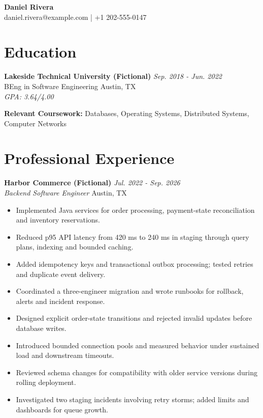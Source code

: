 \documentclass[11pt,a4paper]{article}
\begin{document}
\begin{center}
{\Huge\bfseries Daniel Rivera}\\[6pt]
{\small daniel.rivera@example.com \quad | \quad +1 202-555-0147}
\end{center}
\section{Education}
\textbf{Lakeside Technical University (Fictional)} \hfill \textit{Sep. 2018 - Jun. 2022}\\
BEng in Software Engineering \hfill Austin, TX\\
\textit{GPA: 3.64/4.00}

\textbf{Relevant Coursework:} Databases, Operating Systems, Distributed Systems, Computer Networks
\vspace{4pt}

\section{Professional Experience}
\textbf{Harbor Commerce (Fictional)} \hfill \textit{Jul. 2022 - Sep. 2026}\\
\textit{Backend Software Engineer} \hfill Austin, TX
\begin{itemize}[leftmargin=*,noitemsep,topsep=2pt]
\item Implemented Java services for order processing, payment-state reconciliation and inventory reservations.
\item Reduced p95 API latency from 420 ms to 240 ms in staging through query plans, indexing and bounded caching.
\item Added idempotency keys and transactional outbox processing; tested retries and duplicate event delivery.
\item Coordinated a three-engineer migration and wrote runbooks for rollback, alerts and incident response.
\item Designed explicit order-state transitions and rejected invalid updates before database writes.
\item Introduced bounded connection pools and measured behavior under sustained load and downstream timeouts.
\item Reviewed schema changes for compatibility with older service versions during rolling deployment.
\item Investigated two staging incidents involving retry storms; added limits and dashboards for queue growth.
\end{itemize}
\vspace{4pt}
\end{document}
